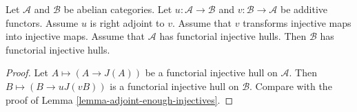 \begin{lemma}
\label{lemma-adjoint-functorial-injectives}
Let $\mathcal{A}$ and $\mathcal{B}$ be abelian categories.
Let $u : \mathcal{A} \to \mathcal{B}$ and
$v : \mathcal{B} \to \mathcal{A}$ be additive functors.
Assume $u$ is right adjoint to $v$.
Assume that $v$ transforms injective maps into injective maps.
Assume that $\mathcal{A}$ has functorial injective hulls.
Then $\mathcal{B}$ has functorial injective hulls.
\end{lemma}

\begin{proof}
Let $A \mapsto (A \to J(A))$ be a functorial
injective hull on $\mathcal{A}$. Then
$B \mapsto (B \to uJ(vB))$ is a functorial
injective hull on $\mathcal{B}$. Compare with the
proof of Lemma \ref{lemma-adjoint-enough-injectives}.
\end{proof}
















